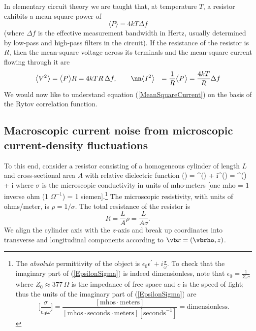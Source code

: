 \documentclass[letterpaper]{article}
\begin{document}
In elementary circuit theory we are taught that, at temperature
$T$, a resistor exhibits a mean-square power of 
$$ \big\langle P \big\rangle = 4 kT \Delta f$$
(where $\Delta f$ is the effective measurement bandwidth in Hertz,
usually determined by low-pass and high-pass filters in the circuit).
If the resistance of the resistor is $R$, then the mean-square voltage 
across its terminals and the mean-square current flowing through it are
\begin{align}
 \big \langle V^2 \big\rangle 
 &= \big\langle P \big \rangle R = 4k T R\, \Delta f, \qquad 
\nn
 \big \langle I^2 \big\rangle 
 &= \frac{1}{R} \big\langle P \big \rangle 
  = \frac{4k T}{R} \Delta f
\label{MeanSquareCurrent}
\end{align}
We would now like to understand equation (\ref{MeanSquareCurrent})
on the basis of the Rytov correlation function.

\subsection*{Macroscopic current noise from microscopic current-density 
             fluctuations}

To this end, consider a resistor consisting of a homogeneous cylinder of
length $L$ and cross-sectional area $A$ with relative dielectric
function
{
 \epsilon(\omega)
 \quad=\quad
 \epsilon^\prime(\omega) + i\epsilon^{\prime\prime}(\omega)
 \quad=\quad
 \epsilon^\prime(\omega) + i\frac{\sigma}{\epsilon_0 \omega}
}
where $\sigma$ is the microscopic conductivity in units of
mho$\cdot$meters [one mho = 1 inverse ohm  (1 $\Omega^{-1}$) = 
1 siemen].\footnote{The \textit{absolute} permittivity
of the object is $\epsilon_0\epsilon^\prime + i\frac{\sigma}{\omega}$. 
To check that the imaginary part of (\ref{EpsilonSigma}) is indeed
dimensionless, note that $\epsilon_0=\frac{1}{Z_0 c}$ where
$Z_0\approx 377\, \Omega$ is the impedance of free space
and $c$ is the speed of light; thus the units of the imaginary
part of (\ref{EpsilonSigma}) are 
$$ \Big[\frac{\sigma}{\epsilon_0 \omega}\Big] 
   =\frac{[\text{mhos$\cdot$meters}]}
         {[\text{mhos$\cdot$seconds$\cdot$meters}][\text{seconds}^{-1}]}
   =\text{dimensionless.}
$$}
The microscopic resistivity, with units of ohms/meter, is
$\rho=1/\sigma$. The total resistance of the resistor is
$$ R=\frac{L}{A}\rho = \frac{L}{A\sigma}.$$
We align the cylinder axis with the $z$-axis and break up 
coordinates into transverse and longitudinal components according to
$\vb x=(\vbrho, z)$.
\end{document}
